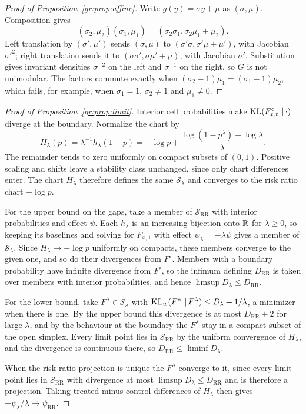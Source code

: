 \begin{proof}[Proof of Proposition~\ref{gr:prop:affine}]
Write $g(y)=\sigma y+\mu$ as $(\sigma,\mu)$. Composition gives
\[
(\sigma_2,\mu_2)(\sigma_1,\mu_1)=(\sigma_2\sigma_1,\sigma_2\mu_1+\mu_2).
\]
Left translation by $(\sigma',\mu')$ sends $(\sigma,\mu)$ to $(\sigma'\sigma,\sigma'\mu+\mu')$, with Jacobian $\sigma'^2$; right translation sends it to $(\sigma\sigma',\sigma\mu'+\mu)$, with Jacobian $\sigma'$. Substitution gives invariant densities $\sigma^{-2}$ on the left and $\sigma^{-1}$ on the right, so $G$ is not unimodular. The factors commute exactly when $(\sigma_2-1)\mu_1=(\sigma_1-1)\mu_2$, which fails, for example, when $\sigma_1=1$, $\sigma_2\ne1$ and $\mu_1\ne0$.
\end{proof}

\begin{proof}[Proof of Proposition~\ref{gr:prop:limit}]
Interior cell probabilities make $\mathrm{KL}(F^\circ_{x,t}\,\|\,\cdot)$ diverge at the boundary. Normalize the chart by
\[
H_\lambda(p)=\lambda^{-1}h_\lambda(1-p)=-\log p+\frac{\log(1-p^\lambda)-\log\lambda}{\lambda}.
\]
The remainder tends to zero uniformly on compact subsets of $(0,1)$. Positive scaling and shifts leave a stability class unchanged, since only chart differences enter. The chart $H_\lambda$ therefore defines the same $\mathcal S_\lambda$ and converges to the risk ratio chart $-\log p$.

For the upper bound on the gaps, take a member of $\mathcal S_{\mathrm{RR}}$ with interior probabilities and effect $\psi$. Each $h_\lambda$ is an increasing bijection onto $\mathbb{R}$ for $\lambda\ge0$, so keeping its baselines and solving for $F_{x,1}$ with effect $\psi_\lambda=-\lambda\psi$ gives a member of $\mathcal S_\lambda$. Since $H_\lambda\to-\log p$ uniformly on compacts, these members converge to the given one, and so do their divergences from $F^{\circ}$. Members with a boundary probability have infinite divergence from $F^{\circ}$, so the infimum defining $D_{\mathrm{RR}}$ is taken over members with interior probabilities, and hence $\limsup D_\lambda\le D_{\mathrm{RR}}$.

For the lower bound, take $F^\lambda\in\mathcal S_\lambda$ with $\mathrm{KL}_w(F^{\circ}\,\|\,F^\lambda)\le D_\lambda+1/\lambda$, a minimizer when there is one. By the upper bound this divergence is at most $D_{\mathrm{RR}}+2$ for large $\lambda$, and by the behaviour at the boundary the $F^\lambda$ stay in a compact subset of the open simplex. Every limit point lies in $\mathcal S_{\mathrm{RR}}$ by the uniform convergence of $H_\lambda$, and the divergence is continuous there, so $D_{\mathrm{RR}}\le\liminf D_\lambda$.

When the risk ratio projection is unique the $F^\lambda$ converge to it, since every limit point lies in $\mathcal S_{\mathrm{RR}}$ with divergence at most $\limsup D_\lambda\le D_{\mathrm{RR}}$ and is therefore a projection. Taking treated minus control differences of $H_\lambda$ then gives $-\psi_\lambda/\lambda\to\psi_{\mathrm{RR}}$.
\end{proof}

